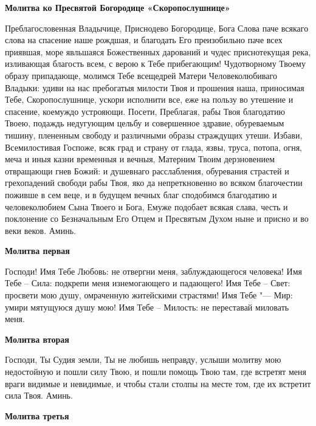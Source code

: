 \medskip


\bfseries Молитва ко Пресвятой Богородице «Скоропослушнице»\normalfont{}


Преблагословенная Владычице, Приснодево Богородице, Бога Слова паче всякаго слова на спасение наше рождшая, и благодать Его преизобильно паче всех приявшая, море явльшаяся Божественных дарований и чудес приснотекущая река, изливающая благость всем, с верою к Тебе прибегающим! Чудотворному Твоему образу припадающе, молимся Тебе всещедрей Матери Человеколюбиваго Владыки: удиви на нас пребогатыя милости Твоя и прошения наша, приносимая Тебе, Скоропослушнице, ускори исполнити все, еже на пользу во утешение и спасение, коемуждо устрояющи. Посети, Преблагая, рабы Твоя благодатию Твоею, подаждь недугующим цельбу и совершенное здравие, обуреваемым тишину, плененным свободу и различными образы страждущих утеши. Избави, Всемилостивая Госпоже, всяк град и страну от глада, язвы, труса, потопа, огня, меча и иныя казни временныя и вечныя, Матерним Твоим дерзновением отвращающи гнев Божий: и душевнаго расслабления, обуревания страстей и грехопадений свободи рабы Твоя, яко да непреткновенно во всяком благочестии поживше в сем веце, и в будущем вечных благ сподобимся благодатию и человеколюбием Сына Твоего и Бога, Емуже подобает всякая слава, честь и поклонение со Безначальным Его Отцем и Пресвятым Духом ныне и присно и во веки веков. Аминь.


\mychapterending




\bfseries Молитва первая\normalfont{}


Господи! Имя Тебе Любовь: не отвергни меня, заблуждающегося человека! Имя Тебе – Сила: подкрепи меня изнемогающего и падающего! Имя Тебе – Свет: просвети мою душу, омраченную житейскими страстями! Имя Тебе "--- Мир: умири мятущуюся душу мою! Имя Тебе – Милость: не переставай миловать меня.


\bfseries Молитва вторая\normalfont{}


Господи, Ты Судия земли, Ты не любишь неправду, услыши молитву мою недостойную и пошли силу Твою, и пошли помощь Твою там, где встретят меня враги видимые и невидимые, и чтобы стали столпы на месте том, где их встретит сила Твоя. Аминь.


\bfseries Молитва третья\normalfont{}


